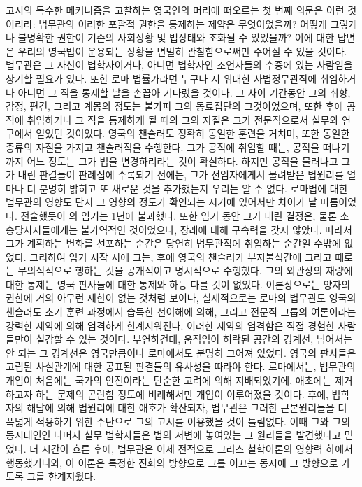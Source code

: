 고시의 특수한 메커니즘을 고찰하는 영국인의 머리에 떠오르는
첫 번째 의문은 이런 것이리라: 법무관의 이러한 포괄적 권한을 통제하는
제약은 무엇이었을까? 어떻게 그렇게나 불명확한 권한이
기존의 사회상황 및 법상태와 조화될 수 있었을까?
이에 대한 답변은 우리의 영국법이 운용되는 상황을 면밀히 관찰함으로써만
주어질 수 있을 것이다.
법무관은 그 자신이 법학자이거나, 아니면 법학자인 조언자들의 수중에 있는
사람임을 상기할 필요가 있다.
또한 로마 법률가라면 누구나 저 위대한 사법정무관직에 취임하거나 아니면
그 직을 통제할 날을 손꼽아 기다렸을 것이다.
그 사이 기간동안 그의 취향, 감정, 편견, 그리고 계몽의 정도는
불가피 그의 동료집단의 그것이었으며,
또한 후에 공직에 취임하거나 그 직을 통제하게 될 때의 그의 자질은
그가 전문직으로서 실무와 연구에서 얻었던 것이었다.
영국의 챈슬러도 정확히 동일한 훈련을 거치며, 또한 동일한 종류의 자질을 가지고
챈슬러직을 수행한다.
그가 공직에 취임할 때는, 공직을 떠나기까지 어느 정도는
그가 법을 변경하리라는 것이 확실하다.
하지만 공직을 물러나고 그가 내린 판결들이 판례집에 수록되기
전에는, 그가 전임자에게서 물려받은 법원리를 얼마나 더 분명히 밝히고
또 새로운 것을 추가했는지 우리는 알 수 없다.
로마법에 대한 법무관의 영향도 단지 그 영향의 정도가 확인되는 시기에 있어서만
차이가 날 따름이었다.
전술했듯이 의 임기는 1년에 불과했다.
또한 임기 동안 그가 내린 결정은, 물론 소송당사자들에게는 불가역적인 것이었으나,
장래에 대해 구속력을 갖지 않았다.
따라서 그가 계획하는 변화를 선포하는 순간은 당연히
법무관직에 취임하는 순간일 수밖에 없었다.
그리하여 임기 시작 시에 그는,
후에 영국의 챈슬러가 부지불식간에 그리고 때로는 무의식적으로 행하는 것을
공개적이고 명시적으로 수행했다.
그의 외관상의 재량에 대한 통제는 영국 판사들에 대한 통제와
하등 다를 것이 없었다.
이론상으로는 양자의 권한에 거의 아무런 제한이 없는 것처럼 보이나,
실제적으로는 로마의 법무관도 영국의 챈슬러도
초기 훈련 과정에서 습득한 선이해에 의해, 그리고
전문직 그룹의 여론이라는 강력한 제약에 의해
엄격하게 한계지워진다.
이러한 제약의 엄격함은 직접 경험한 사람들만이 실감할 수 있는 것이다.
부연하건대, 움직임이 허락된 공간의 경계선, 넘어서는 안 되는 그 경계선은
영국만큼이나 로마에서도 분명히 그어져 있었다.
영국의 판사들은 고립된 사실관계에 대한 공표된 판결들의 유사성을 따라야 한다.
로마에서는, 법무관의 개입이 처음에는 국가의 안전이라는 단순한 고려에 의해
지배되었기에, 애초에는 제거하고자 하는 문제의 곤란함 정도에 비례해서만
개입이 이루어졌을 것이다.
후에, 법학자의 해답에 의해 법원리에 대한 애호가 확산되자,
법무관은 그러한 근본원리들을 더 폭넓게
적용하기 위한 수단으로 그의 고시를 이용했을 것이 틀림없다.
이때 그와 그의 동시대인인 나머지 실무 법학자들은
법의 저변에 놓여있는 그 원리들을 발견했다고 믿었다.
더 시간이 흐른 후에,
법무관은 이제 전적으로 그리스 철학이론의 영향력 하에서
행동했거니와, 이 이론은 특정한 진화의 방향으로 그를 이끄는 동시에
그 방향으로 가도록 그를 한계지웠다.

